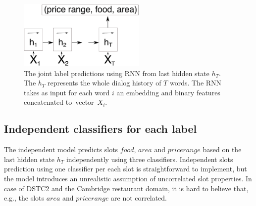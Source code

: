 \documentclass{itatnew}
\def\OD#1{{\color{darkgreen}OD: \it #1}}
\def\ODdel#1{\bgroup\markoverwith{\textcolor{darkgreen}{\rule[0.5ex]{2pt}{1pt}}}\ULon{#1}}
\begin{document}
\begin{figure}
\begin{center}
\includegraphics[height=9em]{encoder_joint}
\caption{The joint label predictions using RNN from last hidden state $h_T$. The $h_T$ represents the whole dialog history of $T$ words. The RNN takes as input for each word $i$ an embedding and binary features concatenated to~vector~$X_{i}$.}
\end{center}
\vspace{-0.70em}
\label{fig_encjoint}
\end{figure}

\subsection{Independent classifiers for each label}
\label{sec:indep}
The independent model predicts slots $food$, $area$ and $price range$ based on the last hidden state $h_{T}$ independently using three classifiers.
Independent slots prediction using one classifier per each slot is straightforward to implement, but the model introduces an unrealistic assumption of uncorrelated slot properties.
In case of DSTC2 and the Cambridge restaurant domain, it is hard to believe that, e.g., the slots $area$ and $price range$ are not correlated.
\end{document}
